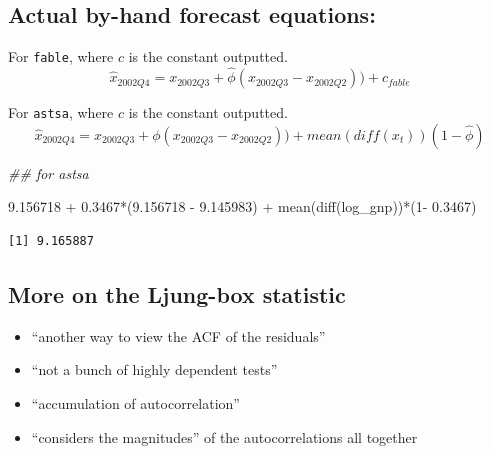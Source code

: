 \documentclass[
  letterpaper,
  DIV=11,
  numbers=noendperiod]{scrartcl}
\newenvironment{Shaded}{\begin{snugshade}}{\end{snugshade}}
\newcommand{\DecValTok}[1]{\textcolor[rgb]{0.68,0.00,0.00}{#1}}
\newcommand{\DocumentationTok}[1]{\textcolor[rgb]{0.37,0.37,0.37}{\textit{#1}}}
\newcommand{\FloatTok}[1]{\textcolor[rgb]{0.68,0.00,0.00}{#1}}
\newcommand{\FunctionTok}[1]{\textcolor[rgb]{0.28,0.35,0.67}{#1}}
\newcommand{\NormalTok}[1]{\textcolor[rgb]{0.00,0.23,0.31}{#1}}
\newcommand{\OtherTok}[1]{\textcolor[rgb]{0.00,0.23,0.31}{#1}}
\newcommand{\SpecialCharTok}[1]{\textcolor[rgb]{0.37,0.37,0.37}{#1}}
\providecommand{\tightlist}{%
  \setlength{\itemsep}{0pt}\setlength{\parskip}{0pt}}\usepackage{longtable,booktabs,array}
\begin{document}
\begin{Shaded}
\end{Shaded}

\subsection{Actual by-hand forecast
equations:}\label{actual-by-hand-forecast-equations}

For \texttt{fable}, where \(c\) is the constant outputted. \[
\hat{x}_{2002 Q4} = x_{2002 Q3} + \hat{\phi}(x_{2002 Q3} - x_{2002 Q2}))+ c_{fable}
\]

For \texttt{astsa}, where \(c\) is the constant outputted. \[
\hat{x}_{2002 Q4} = x_{2002 Q3} + \phi(x_{2002 Q3} - x_{2002 Q2}))+ mean(diff(x_t))(1 - \hat{\phi})
\]

\begin{Shaded}
\begin{Highlighting}[]
\DocumentationTok{\#\# for astsa}

\FloatTok{9.156718} \SpecialCharTok{+} \FloatTok{0.3467}\SpecialCharTok{*}\NormalTok{(}\FloatTok{9.156718} \SpecialCharTok{{-}} \FloatTok{9.145983}\NormalTok{) }\SpecialCharTok{+} \FunctionTok{mean}\NormalTok{(}\FunctionTok{diff}\NormalTok{(log\_gnp))}\SpecialCharTok{*}\NormalTok{(}\DecValTok{1}\SpecialCharTok{{-}} \FloatTok{0.3467}\NormalTok{) }
\end{Highlighting}
\end{Shaded}

\begin{verbatim}
[1] 9.165887
\end{verbatim}

\subsection{More on the Ljung-box
statistic}\label{more-on-the-ljung-box-statistic}

\begin{itemize}
\tightlist
\item
  ``another way to view the ACF of the residuals''
\item
  ``not a bunch of highly dependent tests''
\item
  ``accumulation of autocorrelation''
\item
  ``considers the magnitudes'' of the autocorrelations all together
\end{itemize}
\end{document}
